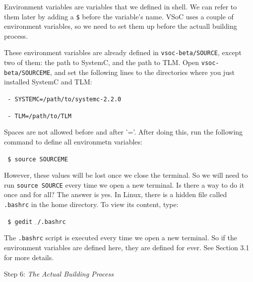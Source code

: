 \documentclass{article}
\begin{document}
{
\addtolength{\leftskip}{12.5mm}

Environment variables are variables that we defined in shell. We can refer to them later by adding a \texttt{\$} before the variable's name. VSoC uses a couple of environment variables, so we need to set them up before the actuall building process.

These environment variables are already defined in \texttt{vsoc-beta/SOURCE}, except two of them: the path to SystemC, and the path to TLM. Open  \texttt{vsoc-beta/SOURCEME}, and set the following lines to the directories where you just installed SystemC and TLM:

\hspace{5mm}\texttt{
- SYSTEMC=/path/to/systemc-2.2.0
}

\hspace{5mm}\texttt{
- TLM=/path/to/TLM
}

Spaces are not allowed before and after '='. After doing this, run the following command to define all environmetn variables:

\hspace{5mm}\texttt{
\$ source SOURCEME
}

However, these values will be lost once we close the terminal. So we will need to run \texttt{source SOURCE} every time we open a new terminal. Is there a way to do it once and for all? The answer is yes. In Linux, there is a hidden file called \texttt{.bashrc} in the home directory. To view its content, type:

\hspace{5mm}\texttt{
\$ gedit $_{\widetilde{~}}$/.bashrc
}

The \texttt{.bashrc} script is executed every time we open a new terminal. So if the environment variables are defined here, they are defined for ever. See Section 3.1 for more details.

}

\vspace{3mm}
\hangindent=12.5mm
Step 6: \emph{The Actual Building Process}
\end{document}
